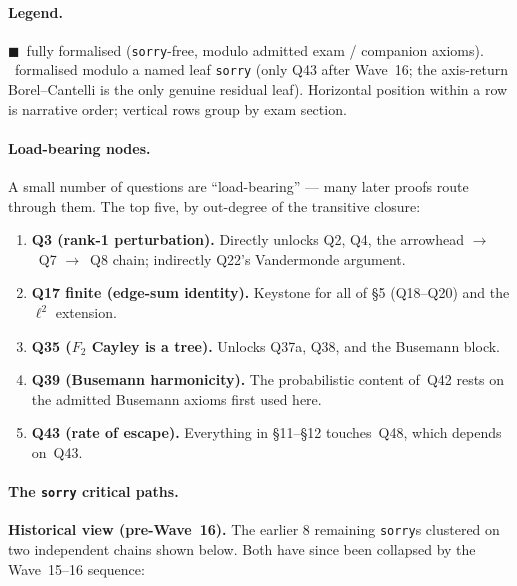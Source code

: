 \documentclass[11pt,a4paper]{article}
\newcommand{\done}[1]{\textcolor{donegreen}{\textbf{#1}}}
\newcommand{\todoc}[1]{\textcolor{todoamber}{\textbf{#1}}}
\newcommand{\cmd}[1]{\texttt{\small #1}}
\theoremstyle{plain}
\theoremstyle{definition}
\begin{document}
\paragraph{Legend.}
\done{$\blacksquare$}~fully formalised (\cmd{sorry}-free, modulo
admitted exam / companion axioms).
\todoc{\textopenbullet}~formalised modulo a named leaf \cmd{sorry}
(only Q43 after Wave~16; the 
axis-return Borel--Cantelli is the only genuine residual leaf).
Horizontal position within a row is narrative order; vertical
rows group by exam section.

\paragraph{Load-bearing nodes.}

A small number of questions are ``load-bearing'' --- many later
proofs route through them. The top five, by out-degree of the
transitive closure:

\begin{enumerate}[leftmargin=1.3em]
\item \textbf{Q3 (rank-1 perturbation).} Directly unlocks Q2, Q4,
the arrowhead $\to$~Q7 $\to$~Q8 chain; indirectly Q22's Vandermonde
argument.
\item \textbf{Q17 finite (edge-sum identity).} Keystone for all of
\S5 (Q18--Q20) and the $\ell^2$ extension.
\item \textbf{Q35 ($F_2$ Cayley is a tree).} Unlocks Q37a, Q38,
and the Busemann block.
\item \textbf{Q39 (Busemann harmonicity).} The probabilistic
content of~Q42 rests on the admitted Busemann axioms first used
here.
\item \textbf{Q43 (rate of escape).} Everything in \S11--\S12
touches~Q48, which depends on~Q43.
\end{enumerate}

\paragraph{The \cmd{sorry} critical paths.} \textbf{Historical
view (pre-Wave~16).} The earlier 8 remaining \cmd{sorry}s
clustered on two independent chains shown below. Both have since
been collapsed by the Wave~15--16 sequence:
\end{document}

